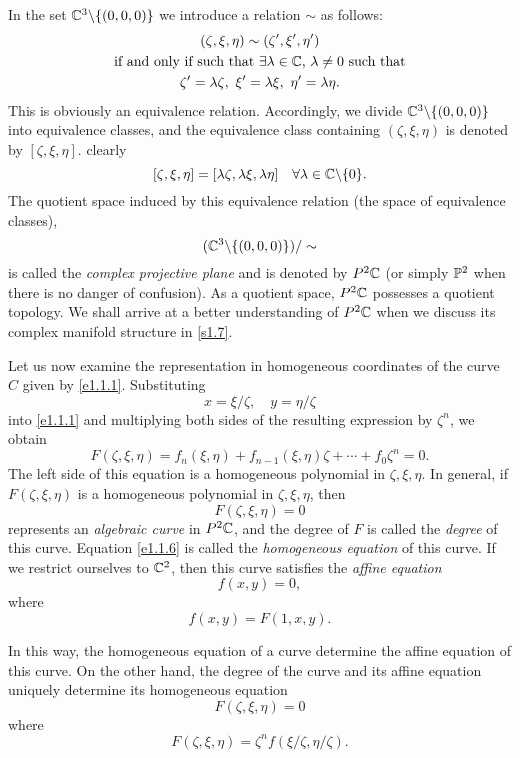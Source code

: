 In the set $\C^3\backslash\{(0,0,0)\}$ we introduce a relation $\sim$ as follows: 
\begin{equation}\label{e1.1.5}
    \begin{gathered}
        (\zeta,\xi,\eta)\sim(\zeta',\xi',\eta')\\
        \text{if and only if such that $\exists\lambda\in\C$, $\lambda\neq0$ such that}\\
        \zeta'=\lambda\zeta, \ \xi'=\lambda\xi, \ \eta'=\lambda\eta. 
    \end{gathered}
\end{equation}
This is obviously an equivalence relation. Accordingly, we divide $\C^3\backslash\{(0,0,0)\}$ into equivalence classes, and the equivalence class containing $(\zeta,\xi,\eta)$ is denoted by $[\zeta,\xi,\eta]$. clearly
$$[\zeta,\xi,\eta]=[\lambda\zeta,\lambda\xi,\lambda\eta]\quad\forall\lambda\in\C\backslash\{0\}. $$
The quotient space induced by this equivalence relation (the space of equivalence classes), 
$$(\C^3\backslash\{(0,0,0)\})/\sim$$
is called the \textit{complex projective plane} and is denoted by $P^2\C$ (or simply $\P^2$ when there is no danger of confusion). As a quotient space, $P^2\C$ possesses a quotient topology. We shall arrive at a better understanding of $P^2\C$ when we discuss its complex manifold structure in \autoref{s1.7}. 

Let us now examine the representation in homogeneous coordinates of the curve $C$ given by \eqref{e1.1.1}. Substituting 
$$x=\xi/\zeta, \quad y=\eta/\zeta$$
into \eqref{e1.1.1} and multiplying both sides of the resulting expression by $\zeta^n$, we obtain 
$$F(\zeta,\xi,\eta)=f_n(\xi,\eta)+f_{n-1}(\xi,\eta)\zeta+\cdots+f_0\zeta^n=0. $$
The left side of this equation is a homogeneous polynomial in $\zeta,\xi,\eta$. In general, if $F(\zeta,\xi,\eta)$ is a homogeneous polynomial in $\zeta,\xi,\eta$, then 
\begin{equation}\label{e1.1.6}
    F(\zeta,\xi,\eta)=0
\end{equation}
represents an \textit{algebraic curve} in $P^2\C$, and the degree of $F$ is called the \textit{degree} of this curve. Equation \eqref{e1.1.6} is called the \textit{homogeneous equation} of this curve. If we restrict ourselves to $\C^2$, then this curve satisfies the \textit{affine equation} 
\begin{equation}\label{e1.1.7}
    f(x,y)=0, 
\end{equation}
where 
$$f(x,y)=F(1,x,y). $$

In this way, the homogeneous equation of a curve determine the affine equation of this curve. On the other hand, the degree of the curve and its affine equation uniquely determine its homogeneous equation 
$$F(\zeta,\xi,\eta)=0$$
where 
$$F(\zeta,\xi,\eta)=\zeta^n f(\xi/\zeta,\eta/\zeta). $$

